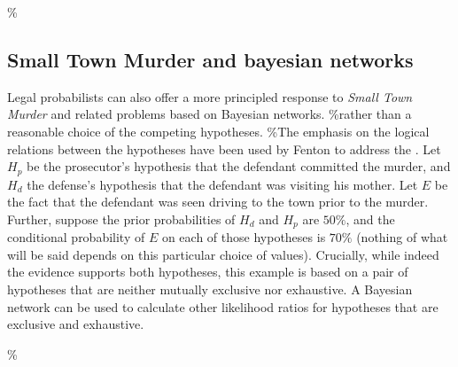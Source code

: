 \documentclass[10pt,dvipsnames,enabledeprecatedfontcommands]{scrartcl}
\begin{document}
\%\subsection{Small Town Murder and bayesian networks}\label{sec:smalltownBN}

Legal probabilists can also offer a more principled response to
\emph{Small Town Murder} and related problems based on Bayesian
networks. \%rather than a reasonable choice of the competing hypotheses.
\%The emphasis on the logical relations between the hypotheses have been
used by Fenton to address the . Let \(H_p\) be the prosecutor's
hypothesis that the defendant committed the murder, and \(H_d\) the
defense's hypothesis that the defendant was visiting his mother. Let
\(E\) be the fact that the defendant was seen driving to the town prior
to the murder. Further, suppose the prior probabilities of \(H_d\) and
\(H_p\) are \(50\%\), and the conditional probability of \(E\) on each
of those hypotheses is \(70\%\) (nothing of what will be said depends on
this particular choice of values). Crucially, while indeed the evidence
supports both hypotheses, this example is based on a pair of hypotheses
that are neither mutually exclusive nor exhaustive. A Bayesian network
can be used to calculate other likelihood ratios for hypotheses that are
exclusive and exhaustive.

\%
\end{document}
